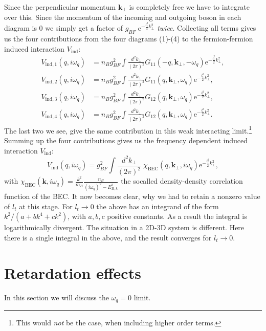Since the perpendicular momentum $\mathbf{k}_\perp$ is completely free we have to integrate over this. Since the momentum of the incoming and outgoing boson in each diagram is 0 we simply get a factor of $g_{BF}\; \text{e}^{-\frac{l_t^2}{4}k_\perp^2}$ \textit{twice}. Collecting all terms gives us the four contributions from the four diagrams (1)-(4) to the fermion-fermion induced interaction $V_{\text{ind}}$: 
\begin{align}
V_{\text{ind},1}(q,i\omega_q) &= n_Bg_{BF}^2\int\frac{d^2k_\perp}{(2\pi)^2}G_{11}(-q,\mathbf{k}_\perp,-\omega_q)\text{e}^{-\frac{l_t^2}{2}k_\perp^2}, \nonumber \\
V_{\text{ind},2}(q,i\omega_q) &= n_Bg_{BF}^2\int\frac{d^2k_\perp}{(2\pi)^2}G_{11}(q,\mathbf{k}_\perp,\omega_q)\text{e}^{-\frac{l_t^2}{2}k_\perp^2}, \nonumber \\
V_{\text{ind},3}(q,i\omega_q) &= n_Bg_{BF}^2\int\frac{d^2k_\perp}{(2\pi)^2}G_{12}(q,\mathbf{k}_\perp,\omega_q)\text{e}^{-\frac{l_t^2}{2}k_\perp^2}, \nonumber \\
V_{\text{ind},4}(q,i\omega_q) &= n_Bg_{BF}^2\int\frac{d^2k_\perp}{(2\pi)^2}G_{12}(q,\mathbf{k}_\perp,\omega_q)\text{e}^{-\frac{l_t^2}{2}k_\perp^2}. 
\end{align}
The last two we see, give the same contribution in this weak interacting limit.\footnote{This would \textit{not} be the case, when including higher order terms.} Summing up the four contributions gives us the frequency dependent induced interaction $V_{\text{ind}}$:
\begin{equation}
V_{\text{ind}}(q,i\omega_q) = g_{BF}^2\int\frac{d^2k_\perp}{(2\pi)^2}\; \chi_\text{BEC}(q,\mathbf{k}_\perp,i\omega_q)\text{e}^{-\frac{l_t^2}{2}k_\perp^2}, 
\label{eq.VFFindXBEC}
\end{equation}
with $\chi_\text{BEC}(\mathbf{k},i\omega_q) = \frac{k^2}{m_B}\frac{n_B}{(i\omega_q)^2-E_{B,k}^2}$ the socalled density-density correlation function of the BEC. It now becomes clear, why we had to retain a nonzero value of $l_t$ at this stage. For $l_t\to 0$ the above has an integrand of the form $k^2/(a+bk^4+ck^2)$, with $a,b,c$ positive constants. As a result the integral is logarithmically divergent. The situation in a 2D-3D system is different. Here there is a single integral in the above, and the result converges for $l_t\to 0$. 

\section{Retardation effects} \label{sec.RetardationEffects}
In this section we will discuss the $\omega_q = 0$ limit. 

